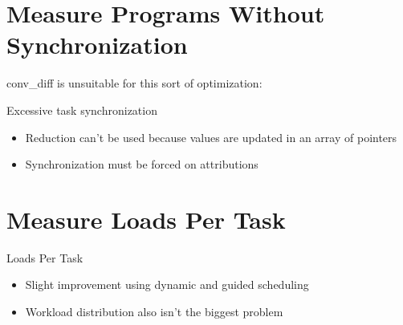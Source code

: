 \documentclass{beamer}
\begin{document}
\section{Measure Programs Without Synchronization}

\begin{frame}[fragile]

	{conv}\_diff is unsuitable for this sort of optimization:
	\begin{block}{Excessive task synchronization}		
		\begin{itemize}
			\item Reduction can't be used because values are updated in an array of pointers
			\item Synchronization must be forced on attributions
		\end{itemize}
	\end{block}
\end{frame}

\section{Measure Loads Per Task}

\begin{frame}[fragile]
	
	\begin{block}{Loads Per Task}
		\begin{itemize}
			\item Slight improvement using dynamic and guided scheduling
			\item Workload distribution also isn't the biggest problem
		\end{itemize}
	\end{block}

\end{frame}
\end{document}
